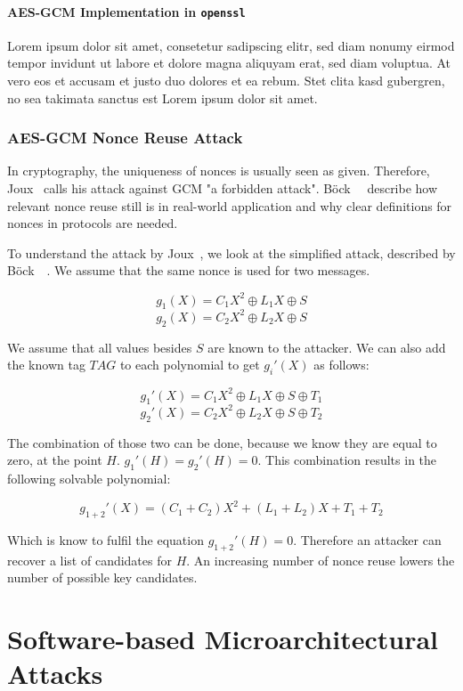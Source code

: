 \paragraph{AES-GCM Implementation in \texttt{openssl}}

Lorem ipsum dolor sit amet, consetetur sadipscing elitr, sed diam nonumy eirmod
tempor invidunt ut labore et dolore magna aliquyam erat, sed diam voluptua. At
vero eos et accusam et justo duo dolores et ea rebum. Stet clita kasd gubergren,
no sea takimata sanctus est Lorem ipsum dolor sit amet.

\subsubsection{AES-GCM Nonce Reuse Attack}

In cryptography, the uniqueness of nonces is usually seen as given. Therefore,
Joux~\cite{NISTGCMcomment} calls his attack against GCM "a forbidden attack".
Böck~\etal~\cite{gcmnonceattack} describe how relevant nonce reuse still is in
real-world application and why clear definitions for nonces in protocols
are needed.

To understand the attack by Joux~\cite{NISTGCMcomment}, we look at the
simplified attack, described by Böck~\etal~\cite{gcmnonceattack}. We assume
that the same nonce is used for two messages.

\[g_1(X) = C{_{1}X^2 \oplus L_1X \oplus S}\]
\[g_2(X) = C{_{2}X^2 \oplus L_2X \oplus S}\]

We assume that all values besides $S$ are known to the attacker. We can also
add the known tag $TAG$ to each polynomial to get $g_i'(X)$ as follows:

\[g_1'(X) = C{_{1}X^2 \oplus L_1X \oplus S \oplus T_1}\]
\[g_2'(X) = C{_{2}X^2 \oplus L_2X \oplus S \oplus T_2}\]

The combination of those two can be done, because we know they are equal to
zero, at the point $H$. $g_1'(H) = g_2'(H) = 0$. This combination results in
the following solvable polynomial:

\[g_{1+2}'(X) = (C_{1} + C_{2})X^2 + (L_1 + L_2)X + T_1 + T_2\]

Which is know to fulfil the equation $g_{1+2}'(H) = 0$. Therefore an attacker
can recover a list of candidates for $H$. An increasing number of nonce
reuse lowers the number of possible key candidates.


\section{Software-based Microarchitectural Attacks}

